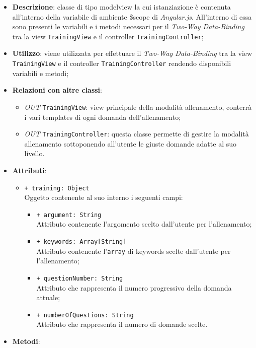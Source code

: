 	\begin{itemize}
		\item \textbf{Descrizione}: classe di tipo modelview la cui istanziazione è contenuta all'interno della variabile di ambiente \$scope di \textit{Angular.js}. All'interno di essa sono presenti le variabili e i metodi necessari per il \textit{Two-Way Data-Binding} tra la view \texttt{TrainingView} e il controller \texttt{TrainingController};
		\item \textbf{Utilizzo}: viene utilizzata per effettuare il \textit{Two-Way Data-Binding} tra la view \texttt{TrainingView} e il controller \texttt{TrainingController} rendendo disponibili variabili e metodi;
		\item \textbf{Relazioni con altre classi}: 
		\begin{itemize}
			\item \textit{OUT} \texttt{TrainingView}: view principale della modalità allenamento, conterrà i vari templates di ogni domanda dell'allenamento; 
			\item \textit{OUT} \texttt{TrainingController}: questa classe permette di gestire la modalità allenamento sottoponendo all'utente le giuste domande adatte al suo livello.
		\end{itemize}
		\item \textbf{Attributi}: 
		\begin{itemize}
			\item \texttt{+ training: Object} \\ Oggetto contenente al suo interno i seguenti campi:
			\begin{itemize}
				\item \texttt{+ argument: String} \\ Attributo contenente l'argomento scelto dall'utente per l'allenamento;
				\item \texttt{+ keywords: Array[String]} \\ Attributo contenente l'\texttt{array} di keywords scelte dall'utente per l'allenamento;
				\item \texttt{+ questionNumber: String} \\ Attributo che rappresenta il numero progressivo della domanda attuale;
				\item \texttt{+ numberOfQuestions: String} \\ Attributo che rappresenta il numero di domande scelte.
			\end{itemize}
		\end{itemize}
		\item \textbf{Metodi}: 

\end{itemize}
